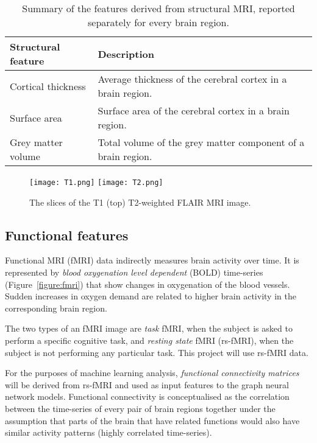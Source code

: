 \begin{table}[]
\centering
    \caption{Summary of the features derived from structural MRI, reported separately for every brain region.}\label{table:structural-features}
    
    \begin{tabular}{lp{11cm}}
        \hline
    \textbf{Structural feature}            & \textbf{Description} \\ \hline
    Cortical thickness &  Average thickness of the cerebral cortex in a brain region. \\
    Surface area       &  Surface area of the cerebral cortex in a brain region. \\
    Grey matter volume &  Total volume of the grey matter component of a brain region. \\ \hline
    \end{tabular}
\end{table}

\begin{figure}[]
    \centering
    \texttt{[image: T1.png]}
    \texttt{[image: T2.png]}
    \caption{The slices of the T1 (top) T2-weighted FLAIR MRI image.}\label{figure:t1-t2}
\end{figure}


\subsection{Functional features}
\label{fmri}

Functional MRI (fMRI) data indirectly measures brain activity over time. It is represented by \textit{blood oxygenation level dependent} (BOLD) time-series (Figure~\ref{figure:fmri}) that show changes in oxygenation of the blood vessels. Sudden increases in oxygen demand are related to higher brain activity in the corresponding brain region.

The two types of an fMRI image are \textit{task} fMRI, when the subject is asked to perform a specific cognitive task, and \textit{resting state} fMRI (rs-fMRI), when the subject is not performing any particular task. This project will use rs-fMRI data.

For the purposes of machine learning analysis, \textit{functional connectivity matrices} will be derived from rs-fMRI and used as input features to the graph neural network models. Functional connectivity is conceptualised as the correlation between the time-series of every pair of brain regions together under the assumption that parts of the brain that have related functions would also have similar activity patterns (highly correlated time-series). 


